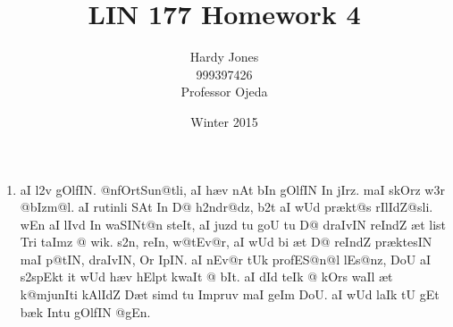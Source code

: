 \documentclass[12pt,letterpaper]{article}
\title{LIN 177 Homework 4\vspace{-2ex}}
\author{Hardy Jones\\
        999397426\\
        Professor Ojeda\vspace{-2ex}}
\date{Winter 2015}
\begin{document}
  \maketitle


  \begin{enumerate}
    \item

      \begin{IPA}
        aI l2v gOlfIN.
        @nfOrtSun@tli, aI h\ae v nAt bIn gOlfIN In jIrz.
        maI skOrz w3r @bIzm@l.
        aI rutinli SAt In D@ h2ndr@dz, b2t aI wUd pr\ae kt@s rIlIdZ@sli.
        wEn aI lIvd In waSINt@n steIt, aI juzd tu goU tu D@ draIvIN reIndZ \ae t list Tri taImz @ wik.
        s2n, reIn, w@tEv@r, aI wUd bi \ae t D@ reIndZ pr\ae ktesIN maI p@tIN, draIvIN, Or \textteshlig IpIN.
        aI nEv@r tUk profES@n@l lEs@nz, DoU aI s2spEkt it wUd h\ae v hElpt kwaIt @ bIt.
        aI dId teIk @ kOrs waIl \ae t k@mjunIti kAlIdZ D\ae t simd tu Impruv maI geIm DoU.
        aI wUd laIk tU gEt b\ae k Intu gOlfIN @gEn.
      \end{IPA}


\end{enumerate}
\end{document}
